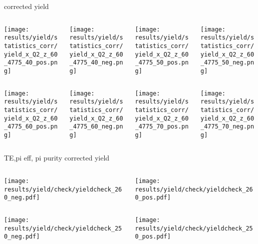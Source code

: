\begin{frame}{corrected yield}
\begin{columns}
\begin{column}[T]{0.25\textwidth}
\texttt{[image: results/yield/statistics\_corr/yield\_x\_Q2\_z\_60\_4775\_40\_pos.png]}
\end{column}
\begin{column}[T]{0.25\textwidth}
\texttt{[image: results/yield/statistics\_corr/yield\_x\_Q2\_z\_60\_4775\_40\_neg.png]}
\end{column}
\begin{column}[T]{0.25\textwidth}
\texttt{[image: results/yield/statistics\_corr/yield\_x\_Q2\_z\_60\_4775\_50\_pos.png]}
\end{column}
\begin{column}[T]{0.25\textwidth}
\texttt{[image: results/yield/statistics\_corr/yield\_x\_Q2\_z\_60\_4775\_50\_neg.png]}
\end{column}
\end{columns}
\begin{columns}
\begin{column}[T]{0.25\textwidth}
\texttt{[image: results/yield/statistics\_corr/yield\_x\_Q2\_z\_60\_4775\_60\_pos.png]}
\end{column}
\begin{column}[T]{0.25\textwidth}
\texttt{[image: results/yield/statistics\_corr/yield\_x\_Q2\_z\_60\_4775\_60\_neg.png]}
\end{column}
\begin{column}[T]{0.25\textwidth}
\texttt{[image: results/yield/statistics\_corr/yield\_x\_Q2\_z\_60\_4775\_70\_pos.png]}
\end{column}
\begin{column}[T]{0.25\textwidth}
\texttt{[image: results/yield/statistics\_corr/yield\_x\_Q2\_z\_60\_4775\_70\_neg.png]}
\end{column}
\end{columns}
\end{frame}
\begin{frame}{TE,pi eff, pi purity corrected yield}
\begin{columns}
\begin{column}[T]{0.5\textwidth}
\texttt{[image: results/yield/check/yieldcheck\_260\_neg.pdf]}
\end{column}
\begin{column}[T]{0.5\textwidth}
\texttt{[image: results/yield/check/yieldcheck\_260\_pos.pdf]}
\end{column}
\end{columns}
\begin{columns}
\begin{column}[T]{0.5\textwidth}
\texttt{[image: results/yield/check/yieldcheck\_250\_neg.pdf]}
\end{column}
\begin{column}[T]{0.5\textwidth}
\texttt{[image: results/yield/check/yieldcheck\_250\_pos.pdf]}
\end{column}
\end{columns}
\end{frame}
